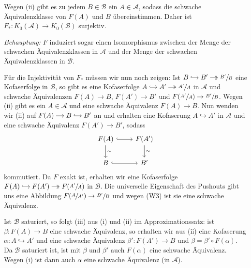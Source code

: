 \begin{beweis}[name={Approximationssatz}]
	Wegen (ii) gibt es zu jedem $B \in \mathcal{B}$ ein $A \in \mathcal{A}$, sodass die schwache Äquivalenzklasse von $F(A)$ und $B$ übereinstimmen.
	Daher ist $F_* \colon K_0(\mathcal{A}) \to K_0(\mathcal{B})$ surjektiv.
	
	\emph{Behauptung:} $F$ induziert sogar einen Isomorphismus zwischen der Menge der schwachen Äquivalenzklassen in $\mathcal{A}$ und der Menge der schwachen Äquivalenzklassen in $\mathcal{B}$.
	
	Für die Injektivität von $F_*$ müssen wir nun noch zeigen: Ist \(
		\begin{tikzcd}[cramped,sep=small]
			B \rar[hook] & B' \rar[two heads] & \sfrac{B'}{B}
		\end{tikzcd}
	\)
	eine Kofaserfolge in $\mathcal{B}$, so gibt es eine Kofaserfolge \(
		\begin{tikzcd}[cramped,sep=small]
			A \rar[hook] & A' \rar[two heads] & \sfrac{A'}{A}
		\end{tikzcd}
	\)
	in $\mathcal{A}$ und schwache Äquivalenzen $F(A) \to B$, $F(A') \to B'$ und $F \enbrace*{\sfrac{A'}{A}} \to \sfrac{B'}{B}$.
	Wegen (ii) gibt es ein $A \in \mathcal{A}$ und eine schwache Äquivalenz $F(A) \to B$.
	Nun wenden wir (ii) auf \(
		\begin{tikzcd}[cramped,sep=small]
			F(A) \rar & B \rar[hook] & B'
		\end{tikzcd}
	\)
	 an und erhalten eine Kofaserung $A \hookrightarrow A'$ in $\mathcal{A}$ und eine schwache Äquivalenz $F(A') \to B'$, sodass 
	 \[
	 	\begin{tikzcd}
	 		F(A) \rar[hook] \dar["\sim"] & F(A') \dar["\sim"] \\
			B \rar[hook] & B'
	 	\end{tikzcd}
	 \]
	 kommutiert.
	 Da $F$ exakt ist, erhalten wir eine Kofaserfolge \(
	 	\begin{tikzcd}[cramped,sep=small]
	 		F(A) \rar[hook] & F(A') \rar[two heads] & F \enbrace*{\sfrac{A'}{A}}
	 	\end{tikzcd}
	 \)
	 in $\mathcal{B}$.
	 Die universelle Eigenschaft des Pushouts gibt uns eine Abbildung $F \enbrace*{\sfrac{A}{A'}} \to \sfrac{B'}{B}$ und wegen (W3) ist sie eine schwache Äquivalenz.
\end{beweis}

\begin{bemerkung}
	Ist $\mathcal{B}$ saturiert, so folgt (iii) aus (i) und (ii) im Approximationssatz:
	ist $\beta \colon F(A) \to B$ eine schwache Äquivalenz, so erhalten wir aus (ii) eine Kofaserung $\alpha \colon A \hookrightarrow A'$ und eine schwache Äquivalenz $\beta' \colon F(A') \to B$ und $\beta = \beta' \circ  F(\alpha)$.
	Da $\mathcal{B}$ saturiert ist, ist mit $\beta$ und $\beta'$ auch $F(\alpha)$ eine schwache Äquivalenz.
	Wegen (i) ist dann auch $\alpha$ eine schwache Äquivalenz (in $\mathcal{A}$).
\end{bemerkung}


